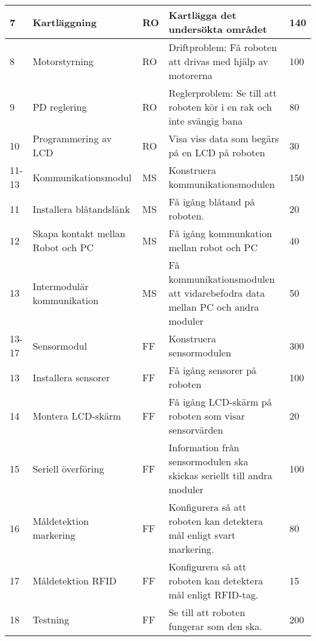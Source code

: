 \documentclass[11pt]{article}
\begin{document}
\begin{flushleft}
\begin{table}[h]
\begin{tabular}{|l|p{.30\linewidth}|l|p{.40\linewidth}|p{.10\linewidth}|}
7 &
Kartläggning &
RO &
Kartlägga det undersökta området &
140 \\ \hline
 
8 &
Motorstyrning &
RO &
Driftproblem: Få roboten att drivas med hjälp av motorerna &
100 \\ \hline
 
9 &
PD reglering &
RO &
Reglerproblem: Se till att roboten kör i en rak och inte svängig bana &
80 \\ \hline
 
10 &
Programmering av LCD &
RO &
Visa viss data som begärs på en LCD på roboten &
30 \\ \hline
 
11-13 &
Kommunikationsmodul &
MS &
Konstruera kommunikationsmodulen &
150 \\ \hline

11 &
Installera blåtandslänk &
MS &
Få igång blåtand på roboten. &
20 \\ \hline
 
12 &
Skapa kontakt mellan Robot och PC &
MS &
Få igång kommunkation mellan robot och PC &
40 \\ \hline
 
13 &
Intermodulär kommunikation &
MS &
Få kommunikationsmodulen att vidarebefodra data mellan PC och andra moduler &
50 \\ \hline
 
13-17 &
Sensormodul &
FF &
Konstruera sensormodulen &
300 \\ \hline
 
13 &
Installera sensorer&
FF &
Få igång sensorer på roboten&
100 \\ \hline

14 &
Montera LCD-skärm&
FF &
Få igång LCD-skärm på roboten som visar sensorvärden&
20 \\ \hline

15 &
Seriell överföring&
FF &
Information från sensormodulen ska skickas seriellt till andra moduler&
100 \\ \hline

16 &
Måldetektion markering&
FF &
Konfigurera så att roboten kan detektera mål enligt svart markering.&
80 \\ \hline

17 &
Måldetektion RFID&
FF &
Konfigurera så att roboten kan detektera mål enligt RFID-tag.&
15 \\ \hline

18 &
Testning&
FF &
Se till att roboten fungerar som den ska.&
200 \\ \hline


\end{tabular}
\end{table}
\end{flushleft}
\end{document}

